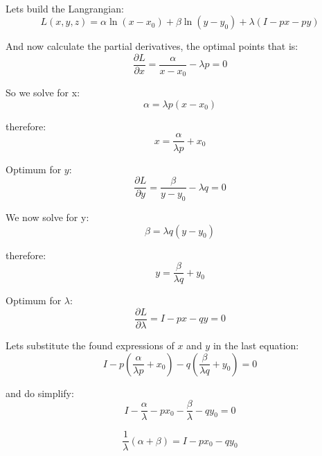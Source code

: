 \documentclass{article}
\begin{document}
\paragraph{}
Lets build the Langrangian:
\begin{equation}
  L(x, y, z) = \alpha \ln (x - x_0) + \beta \ln (y - y_0) + \lambda (I - px - py)
\end{equation}

And now calculate the partial derivatives, the optimal points that is:
\begin{equation}
  \frac{\partial L}{\partial x} = \frac{\alpha}{x - x_0} - \lambda p = 0
\end{equation}

So we solve for x:
\begin{equation}
  \alpha = \lambda p (x - x_0)
\end{equation}

therefore:
\begin{equation}
  x = \frac{\alpha}{\lambda p} + x_0
\end{equation}

Optimum for $y$:
\begin{equation}
  \frac{\partial L}{\partial y} = \frac{\beta}{y - y_0} - \lambda q = 0
\end{equation}

We now solve for y:
\begin{equation}
  \beta = \lambda q (y - y_0)
\end{equation}

therefore:
\begin{equation}
  y = \frac{\beta}{\lambda q} + y_0
\end{equation}

Optimum for $\lambda$:
\begin{equation}
  \frac{\partial L}{\partial \lambda} = I - px - qy = 0
\end{equation}

Lets substitute the found expressions of $x$ and $y$ in the last equation:
\begin{equation}
  I - p \left( \frac{\alpha}{\lambda p} + x_0 \right) - q \left( \frac{\beta}{\lambda q} + y_0 \right) = 0
\end{equation}

and do simplify:
\begin{equation}
  I - \frac{\alpha}{\lambda} - px_0 - \frac{\beta}{\lambda} - qy_0 = 0
\end{equation}

\begin{equation}
  \frac{1}{\lambda} (\alpha + \beta) = I - px_0 - qy_0
\end{equation}
\end{document}
